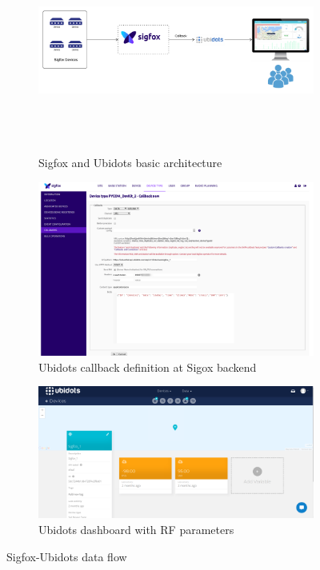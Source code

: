 \documentclass[12pt]{article}
\begin{document}
\begin{figure}[H]
  \begin{subfigure}[h]{\columnwidth}
  \centering
    \includegraphics[width=0.9\columnwidth,height= 6cm,keepaspectratio]{Images/sigfox-ubidotsArchitecture.pdf}
    \label{fig:Sigfox and Ubidots basic architecture}
    \caption{Sigfox and Ubidots basic architecture}
\end{subfigure}
  
  \begin{subfigure}[t]{\columnwidth}
\centering
    \includegraphics[trim=0.5cm 6cm 1cm 0cm,clip=true,width=0.9\columnwidth,totalheight=6cm,keepaspectratio ]{Images/SigfoxUbidotsCallback.pdf}
    \caption{Ubidots callback definition at Sigox backend}
  \end{subfigure}
  
  
  \begin{subfigure}[t]{\columnwidth}
\centering
    \includegraphics[trim=0.5cm 1cm 2cm 0cm,clip=true,width=0.9\columnwidth,totalheight=6cm,keepaspectratio ]{Images/UbidotsDashboard.pdf}
    \caption{Ubidots dashboard with RF parameters}
  \end{subfigure}
  
    \caption{Sigfox-Ubidots data flow}
    \label{fig:Sigfox-Ubidots data flow}
\end{figure}
\end{document}
